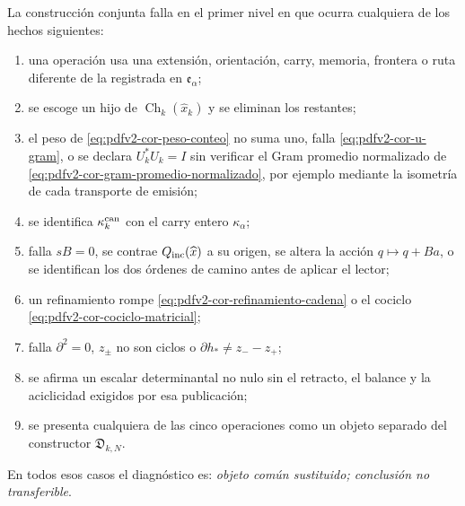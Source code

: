 \begin{criterion}
\label{crit:pdfv2-cor-falsadores}
La construcción conjunta falla en el primer nivel en que ocurra cualquiera de
los hechos siguientes:
\begin{enumerate}
 \item una operación usa una extensión, orientación, carry, memoria, frontera
 o ruta diferente de la registrada en \(\mathfrak e_\alpha\);
 \item se escoge un hijo de
 \(\operatorname{Ch}_k(\widehat x_k)\) y se eliminan los restantes;
 \item el peso de \eqref{eq:pdfv2-cor-peso-conteo} no suma uno, falla
 \eqref{eq:pdfv2-cor-u-gram}, o se declara \(U_k^*U_k=I\) sin verificar
 el Gram promedio normalizado de
 \eqref{eq:pdfv2-cor-gram-promedio-normalizado}, por ejemplo mediante
 la isometría de cada transporte de emisión;
 \item se identifica \(\kappa_k^{\rm can}\) con el carry entero
 \(\kappa_\alpha\);
 \item falla \(sB=0\), se contrae
 \(Q_{\rm inc}(\widehat x)\) a su origen, se altera la acción
 \(q\mapsto q+Ba\), o se identifican los dos órdenes de camino antes de
 aplicar el lector;
 \item un refinamiento rompe
 \eqref{eq:pdfv2-cor-refinamiento-cadena} o el cociclo
 \eqref{eq:pdfv2-cor-cociclo-matricial};
 \item falla \(\partial^2=0\), \(z_\pm\) no son ciclos o
 \(\partial h_*\neq z_--z_+\);
 \item se afirma un escalar determinantal no nulo sin el retracto, el
 balance y la aciclicidad exigidos por esa publicación;
 \item se presenta cualquiera de las cinco operaciones como un objeto
 separado del constructor \(\mathfrak D_{k,N}\).
\end{enumerate}
En todos esos casos el diagnóstico es: \emph{objeto común sustituido;
conclusión no transferible}.
\end{criterion}
